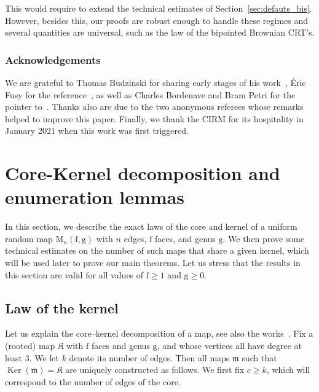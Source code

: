\documentclass[11pt]{article}
\theoremstyle{plain}
\theoremstyle{definition}
\theoremstyle{remark}
\newcommand{\map}{\mathfrak{m}}
\newcommand{\Map}{\mathrm{M}}
\newcommand{\face}{\mathrm{f}}
\newcommand{\gen}{\mathrm{g}}
\DeclareMathOperator{\Ker}{Ker}
\newcommand{\kernel}{\mathfrak{K}}
\begin{document}
This would require to extend the technical estimates of Section~\ref{sec:defauts_bis}. However, besides this, our proofs are robust enough to handle these regimes and several quantities are universal, such as the law of the bipointed Brownian CRT's.

\subsubsection*{Acknowledgements}
We are grateful to Thomas Budzinski for sharing early stages of his work~\cite{Bud21}, \'Eric Fusy for the reference~\cite{BCR93}, as well as Charles Bordenave and Bram Petri for the pointer to~\cite[Th.\,2.19]{Wor99}.
Thanks also are due to the two anonymous referees whose remarks helped to improve this paper.
Finally, we thank the CIRM for its hospitality in January 2021 when this work was first triggered.

\section{Core-Kernel decomposition and enumeration lemmas}
\label{sec:enumeration}

In this section, we describe the exact laws of the core and kernel of a uniform random map $ \Map_n(\face,\gen)$ with $n$ edges, $\face$ faces, and genus $\gen$. We then prove some technical estimates on the number of such maps that share a given kernel, which will be used later to prove our main theorems.
Let us stress that the results in this section are valid for
all values of $\face \ge 1$ and $\gen \ge 0$.

\subsection{Law of the kernel}
\label{sec:decomposition}

Let us explain
the core--kernel decomposition of a map, see also the works~\cite{CMS09,Cha10}. Fix a (rooted) map $\kernel$ with $\face$ faces and genus $\gen$, and whose vertices all have degree at least $3$. We let $k$ denote its number of edges. Then all maps $\map$ such that $ \Ker(\map) = \kernel$ are uniquely constructed as follows. We first fix $c \geq k$, which will correspond to the number of edges of the core.
\end{document}
